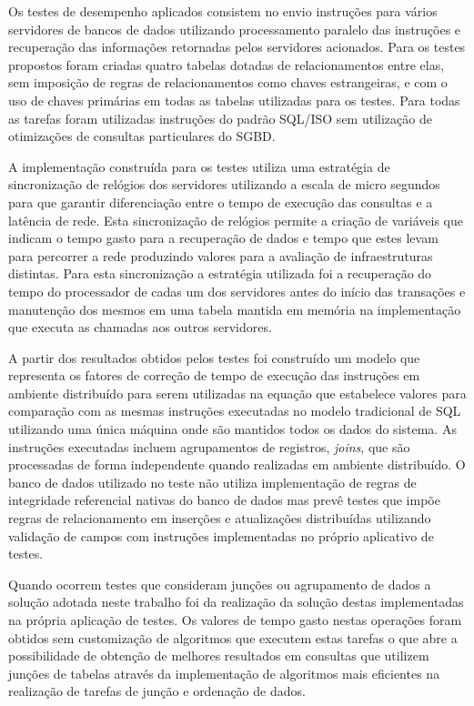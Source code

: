 \documentclass[12pt, a4paper]{article}
\begin{document}
Os testes de desempenho aplicados consistem no envio instruções para vários servidores de bancos de dados
utilizando processamento paralelo das instruções e recuperação das informações retornadas pelos servidores
acionados. Para os testes propostos foram criadas quatro tabelas dotadas de relacionamentos entre elas, sem
imposição de regras de relacionamentos como chaves estrangeiras, e com o uso de chaves primárias em 
todas as tabelas utilizadas para os testes. Para todas as tarefas foram utilizadas instruções do padrão
SQL/ISO sem utilização de otimizações de consultas particulares do SGBD.

A implementação construída para os testes utiliza uma estratégia de sincronização de relógios dos servidores
utilizando a escala de micro segundos para que garantir diferenciação entre o tempo de execução das consultas
e a latência de rede. Esta sincronização de relógios permite a criação de variáveis que indicam o tempo
gasto para a recuperação de dados e tempo que estes levam para percorrer a rede produzindo valores para 
a avaliação de infraestruturas distintas. Para esta sincronização a estratégia utilizada foi a recuperação
do tempo do processador de cadas um dos servidores antes do início das transações e manutenção dos mesmos
em uma tabela mantida em memória na implementação que executa as chamadas aos outros servidores.


A partir dos resultados obtidos pelos testes  foi construído um modelo que representa os fatores de
correção de tempo de execução das instruções em ambiente distribuído para serem utilizadas na equação que 
estabelece valores para comparação com as mesmas instruções executadas no modelo tradicional de SQL
utilizando uma única máquina onde são mantidos todos os dados do sistema. As instruções executadas incluem
agrupamentos de registros, \textit{joins}, que são processadas de forma independente quando realizadas em
ambiente distribuído. O banco de dados utilizado no teste não utiliza implementação de regras de integridade
referencial nativas do banco de dados mas prevê testes que impõe regras de relacionamento em inserções
e atualizações distribuídas utilizando validação de campos com instruções implementadas no próprio aplicativo
de testes.

Quando ocorrem testes que consideram junções ou agrupamento de dados a solução adotada neste trabalho foi da realização
da solução destas implementadas na própria aplicação de testes. Os valores de tempo gasto nestas operações
foram obtidos sem customização de algoritmos que executem estas tarefas o que abre a possibilidade de obtenção
de melhores resultados em consultas que utilizem junções de tabelas através da implementação de algoritmos
mais eficientes na realização de tarefas de junção e ordenação de dados. 
\end{document}
